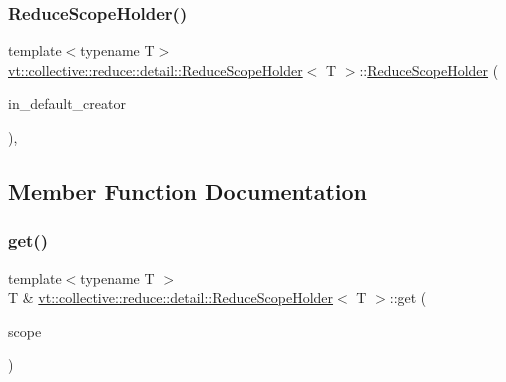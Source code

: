\subsubsection{\texorpdfstring{Reduce\+Scope\+Holder()}{ReduceScopeHolder()}}
{\footnotesize\ttfamily template$<$typename T$>$ \\
\hyperlink{structvt_1_1collective_1_1reduce_1_1detail_1_1_reduce_scope_holder}{vt\+::collective\+::reduce\+::detail\+::\+Reduce\+Scope\+Holder}$<$ T $>$\+::\hyperlink{structvt_1_1collective_1_1reduce_1_1detail_1_1_reduce_scope_holder}{Reduce\+Scope\+Holder} (\begin{DoxyParamCaption}\item[{\hyperlink{structvt_1_1collective_1_1reduce_1_1detail_1_1_reduce_scope_holder_ac1bca1874a023b11bdc3c26b165c3b20}{Default\+Create\+Function}}]{in\+\_\+default\+\_\+creator }\end{DoxyParamCaption})\hspace{0.3cm}{\ttfamily [inline]}, {\ttfamily [explicit]}}



\subsection{Member Function Documentation}
\mbox{\label{structvt_1_1collective_1_1reduce_1_1detail_1_1_reduce_scope_holder_a2cdb8cd71e43cc7a744bdd16d5ed1651}} 
\subsubsection{\texorpdfstring{get()}{get()}\hspace{0.1cm}{\footnotesize\ttfamily [1/6]}}
{\footnotesize\ttfamily template$<$typename T $>$ \\
T \& \hyperlink{structvt_1_1collective_1_1reduce_1_1detail_1_1_reduce_scope_holder}{vt\+::collective\+::reduce\+::detail\+::\+Reduce\+Scope\+Holder}$<$ T $>$\+::get (\begin{DoxyParamCaption}\item[{\hyperlink{structvt_1_1collective_1_1reduce_1_1detail_1_1_reduce_scope}{Reduce\+Scope} const \&}]{scope }\end{DoxyParamCaption})}

